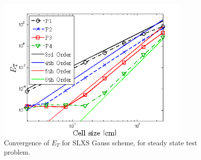 %
\begin{figure}[!hbp]
\centering
\includegraphics[width=9.5cm]{chapter6_grey_radtran/Dissertation_Data/Constant_Time_SLXS_Gauss_temp_L2.png}
\caption{Convergence of $E_{T}$ for SLXS Gauss scheme, for steady state test problem.}
\label{fig:constant_time_gauss_t}
\end{figure}

\newpage

